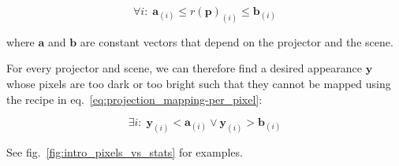 \begin{equation}
    \label{eq:projection_mapping-limitations}
    \forall i:\; \bm{a}_{(i)} \leq r(\bm{p})_{(i)} \leq \bm{b}_{(i)}
\end{equation}

where \(\bm{a}\) and \(\bm{b}\) are constant vectors that depend on the projector and the scene.

For every projector and scene, we can therefore find a desired appearance \(\bm{y}\) whose pixels are too dark or too bright such that they cannot be mapped using the recipe in eq.~\ref{eq:projection_mapping-per_pixel}:

\begin{equation}
    \label{eq:projection_mapping-hard_image}
    \exists i:\; \bm{y}_{(i)} < \bm{a}_{(i)} \lor \bm{y}_{(i)} > \bm{b}_{(i)}
\end{equation}

See fig.~\ref{fig:intro_pixels_vs_stats} for examples.

